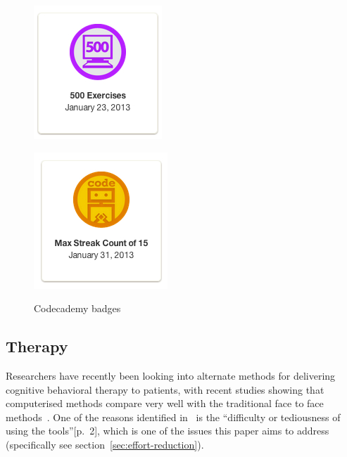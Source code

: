 \documentclass[a4paper,12pt]{article}
\begin{document}
\begin{figure}[!ht]
	\centering
	\begin{minipage}{.5\textwidth}
	  \centering
	  \includegraphics[width=.6\linewidth]{./images/codecademy-badge-500exercises}
	  \label{codecademy-badge-500exercises}
	\end{minipage}%
	\begin{minipage}{.5\textwidth}
	  \centering
	  \includegraphics[width=.6\linewidth]{./images/codecademy-badge-maxstreak}
	  \label{codecademy-badge-maxstreak}
	\end{minipage}
	\caption{Codecademy badges}
	\label{codecademy-badges}
\end{figure}

\subsection{Therapy}
Researchers have recently been looking into alternate methods for delivering cognitive behavioral therapy to patients, with recent studies showing that computerised methods compare very well with the traditional face to face methods~\citep{games-for-behavior-change}. 
One of the reasons identified in~\citep{games-for-behavior-change} is the ``difficulty or tediousness of using the tools''[p.~2], which is one of the issues this paper aims to address (specifically see section~\ref{sec:effort-reduction}).
\end{document}
